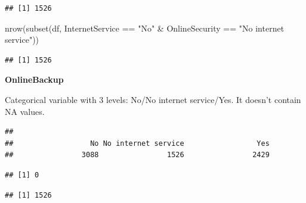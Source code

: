 \documentclass[
  twoside]{article}
\newenvironment{Shaded}{\begin{snugshade}}{\end{snugshade}}
\newcommand{\CommentTok}[1]{\textcolor[rgb]{0.56,0.35,0.01}{\textit{#1}}}
\newcommand{\FunctionTok}[1]{\textcolor[rgb]{0.00,0.00,0.00}{#1}}
\newcommand{\NormalTok}[1]{#1}
\newcommand{\SpecialCharTok}[1]{\textcolor[rgb]{0.00,0.00,0.00}{#1}}
\newcommand{\StringTok}[1]{\textcolor[rgb]{0.31,0.60,0.02}{#1}}
\begin{document}
\begin{Shaded}
\end{Shaded}

\begin{verbatim}
## [1] 1526
\end{verbatim}

\begin{Shaded}
\begin{Highlighting}[]
\FunctionTok{nrow}\NormalTok{(}\FunctionTok{subset}\NormalTok{(df, InternetService }\SpecialCharTok{==} \StringTok{"No"} \SpecialCharTok{\&}\NormalTok{ OnlineSecurity }\SpecialCharTok{==} \StringTok{"No internet service"}\NormalTok{))}
\end{Highlighting}
\end{Shaded}

\begin{verbatim}
## [1] 1526
\end{verbatim}

\textbf{OnlineBackup}

Categorical variable with 3 levels: No/No internet service/Yes. It
doesn't contain NA values.

\begin{verbatim}
## 
##                  No No internet service                 Yes 
##                3088                1526                2429
\end{verbatim}

\begin{verbatim}
## [1] 0
\end{verbatim}

\begin{Shaded}
\end{Shaded}

\begin{verbatim}
## [1] 1526
\end{verbatim}

\begin{Shaded}
\end{Shaded}
\end{document}
